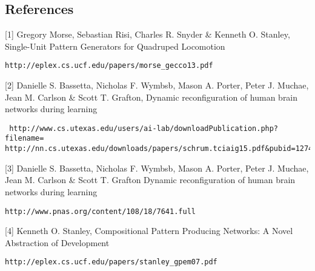 \documentclass[11pt, a4paper]{article}
\begin{document}
\subsection{References}
[1]
Gregory Morse, Sebastian Risi, Charles R. Snyder \& Kenneth O. Stanley,
Single-Unit Pattern Generators for Quadruped Locomotion
\begin{verbatim}
http://eplex.cs.ucf.edu/papers/morse_gecco13.pdf

\end{verbatim}
[2]
Danielle S. Bassetta, Nicholas F. Wymbsb, Mason A. Porter, Peter J. Muchae, Jean M. Carlson \& Scott T. Grafton,
Dynamic reconfiguration of human brain networks during learning
\begin{verbatim} http://www.cs.utexas.edu/users/ai-lab/downloadPublication.php?filename=
http://nn.cs.utexas.edu/downloads/papers/schrum.tciaig15.pdf&pubid=127492

\end{verbatim}
[3]
Danielle S. Bassetta, Nicholas F. Wymbsb, Mason A. Porter, Peter J. Muchae, Jean M. Carlson \& Scott T. Grafton
Dynamic reconfiguration of human brain networks during learning
\begin{verbatim}
http://www.pnas.org/content/108/18/7641.full

\end{verbatim}
[4]
Kenneth O. Stanley,
Compositional Pattern Producing Networks: A Novel Abstraction of Development
\begin{verbatim}
http://eplex.cs.ucf.edu/papers/stanley_gpem07.pdf
\end{verbatim}
\end{document}
